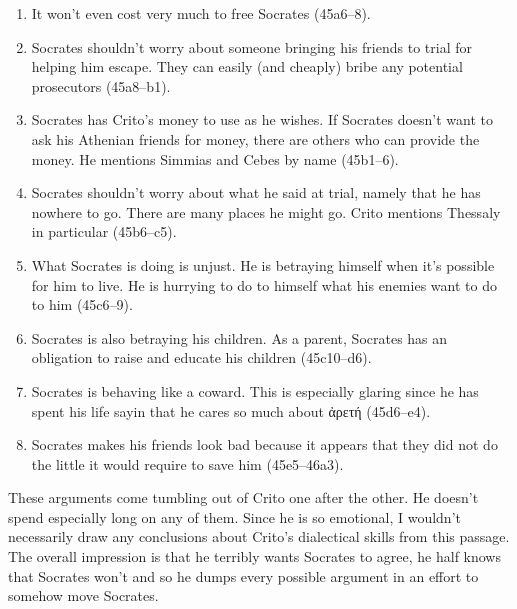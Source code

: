 \documentclass[11pt]{article}
\begin{document}
\begin{enumerate}

    \item It won't even cost very much to free Socrates (45a6--8).

    \item Socrates shouldn't worry about someone bringing his friends to trial
        for helping him escape.  They can easily (and cheaply) bribe any
        potential prosecutors (45a8--b1).

    \item Socrates has Crito's money to use as he wishes.  If Socrates doesn't
        want to ask his Athenian friends for money, there are others who can
        provide the money.  He mentions Simmias and Cebes by name (45b1--6).

    \item Socrates shouldn't worry about what he said at trial, namely that he
        has nowhere to go.  There are many places he might go.  Crito mentions
        Thessaly in particular (45b6--c5).

    \item What Socrates is doing is unjust.  He is betraying himself when it's
        possible for him to live.  He is hurrying to do to himself what his
        enemies want to do to him (45c6--9).

    \item Socrates is also betraying his children.  As a parent, Socrates has
        an obligation to raise and educate his children (45c10--d6).

    \item Socrates is behaving like a coward.  This is especially glaring since
        he has spent his life sayin that he cares so much about {\g ἀρετή}
        (45d6--e4).

    \item Socrates makes his friends look bad because it appears that they did
        not do the little it would require to save him (45e5--46a3).

\end{enumerate}

These arguments come tumbling out of Crito one after the other.  He doesn't
spend especially long on any of them.  Since he is so emotional, I wouldn't
necessarily draw any conclusions about Crito's dialectical skills from this
passage.  The overall impression is that he terribly wants Socrates to agree,
he half knows that Socrates won't and so he dumps every possible argument in an
effort to somehow move Socrates.
\end{document}
